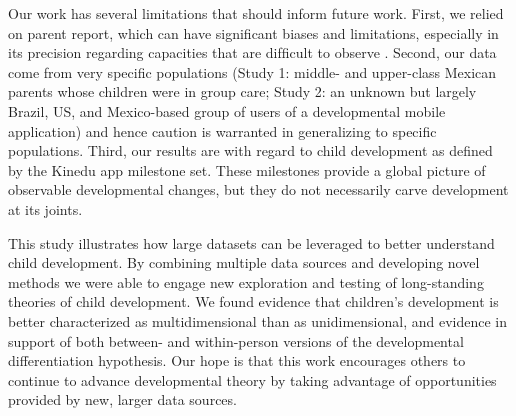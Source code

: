 \documentclass[man, floatsintext]{apa7}
\begin{document}
Our work has several limitations that should inform future work. First,
we relied on parent report, which can have significant biases and
limitations, especially in its precision regarding capacities that are
difﬁcult to observe \parencite[e.g., cognitive abilities;][]{frank2021,feldman2000}. Second, our
data come from very specific populations (Study 1: middle- and
upper-class Mexican parents whose children were in group care; Study 2:
an unknown but largely Brazil, US, and Mexico-based group of users of a developmental mobile application) and hence
caution is warranted in generalizing to specific populations. Third, our results are with regard to child development
as deﬁned by the Kinedu app milestone set. These milestones provide a global picture of observable developmental changes, but they do not necessarily carve development at its joints.

This study illustrates how
large datasets can be leveraged to better understand child development. By
combining multiple data sources and developing novel methods we
were able to engage new exploration and testing of long-standing theories of child development. We found evidence that children's development is better characterized as multidimensional than as unidimensional, and evidence in support of both between- and within-person versions of the
developmental differentiation hypothesis. Our hope is
that this work encourages others to continue to advance developmental
theory by taking advantage of opportunities provided by new,
larger data sources.

\printbibliography
\end{document}
